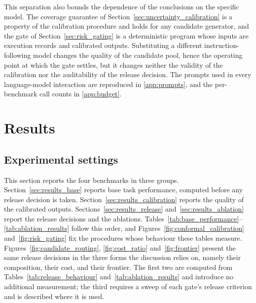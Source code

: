 \documentclass[preprint,12pt,authoryear]{elsarticle}
\begin{document}
This separation also bounds the dependence of the conclusions on the specific model. The coverage guarantee of Section~\ref{sec:uncertainty_calibration} is a property of the calibration procedure and holds for any candidate generator, and the gate of Section~\ref{sec:risk_gating} is a deterministic program whose inputs are execution records and calibrated outputs. Substituting a different instruction-following model changes the quality of the candidate pool, hence the operating point at which the gate settles, but it changes neither the validity of the calibration nor the auditability of the release decision. The prompts used in every language-model interaction are reproduced in \ref{app:prompts}, and the per-benchmark call counts in \ref{app:budget}.
\section{Results}
\label{sec:results}

\subsection{Experimental settings}
\label{sec:results_protocol}

This section reports the four benchmarks in three groups.
Section~\ref{sec:results_base} reports base task performance, computed before any release decision is taken.
Section~\ref{sec:results_calibration} reports the quality of the calibrated outputs.
Sections~\ref{sec:results_release} and~\ref{sec:results_ablation} report the release decisions and the ablations.
Tables~\ref{tab:base_performance}--\ref{tab:ablation_results} follow this order, and Figures~\ref{fig:conformal_calibration} and~\ref{fig:risk_gating} fix the procedures whose behaviour these tables measure.
Figures~\ref{fig:candidate_routing}, \ref{fig:cost_ratio} and~\ref{fig:frontier} present the same release decisions in the three forms the discussion relies on, namely their composition, their cost, and their frontier.
The first two are computed from Tables~\ref{tab:release_behaviour} and~\ref{tab:ablation_results} and introduce no additional measurement; the third requires a sweep of each gate's release criterion and is described where it is used.
\end{document}
